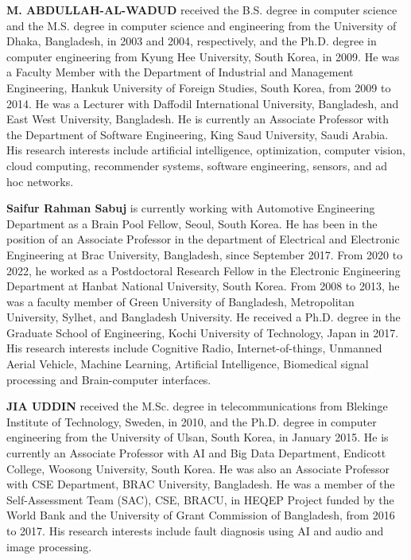 \documentclass[a4paper,fleqn]{cas-sc}
\begin{document}
\textbf{M. ABDULLAH-AL-WADUD} received the B.S. degree in computer science and the M.S. degree in computer science and engineering from the University of Dhaka, Bangladesh, in 2003 and 2004, respectively, and the Ph.D. degree in computer engineering from Kyung Hee University, South Korea, in 2009. He was a Faculty Member with the Department of Industrial and Management Engineering, Hankuk University of Foreign Studies, South Korea, from 2009 to 2014. He was a Lecturer with Daffodil International University, Bangladesh, and East West University, Bangladesh. He is currently an Associate Professor with the Department of Software Engineering, King Saud University, Saudi Arabia. His research interests include artificial intelligence, optimization, computer vision, cloud computing, recommender systems, software engineering, sensors, and ad hoc networks.
\endbio



\textbf{Saifur Rahman Sabuj} is currently working with Automotive Engineering Department as a Brain Pool Fellow, Seoul, South Korea. He has been in the position of an Associate Professor in the department of Electrical and Electronic Engineering at Brac University, Bangladesh, since September 2017. From 2020 to 2022, he worked as a Postdoctoral Research Fellow in the Electronic Engineering Department at Hanbat National University, South Korea. From 2008 to 2013, he was a faculty member of Green University of Bangladesh, Metropolitan University, Sylhet, and Bangladesh University. He received a Ph.D. degree in the Graduate School of Engineering, Kochi University of Technology, Japan in 2017. His research interests include Cognitive Radio, Internet-of-things, Unmanned Aerial Vehicle, Machine Learning, Artificial Intelligence, Biomedical signal processing and Brain-computer interfaces.
\endbio


\textbf{JIA UDDIN} received the M.Sc. degree in telecommunications from Blekinge Institute of Technology, Sweden, in 2010, and the Ph.D. degree in computer engineering from the University of Ulsan, South Korea, in January 2015. He is currently an Associate Professor with AI and Big Data Department, Endicott College, Woosong University, South Korea. He was also an Associate Professor with CSE Department, BRAC University, Bangladesh. He was a member of the Self-Assessment Team (SAC), CSE, BRACU, in HEQEP Project funded by the World Bank and the University of Grant Commission of Bangladesh, from 2016 to 2017. His research interests include fault diagnosis using AI and audio and image processing.
\endbio
\end{document}
